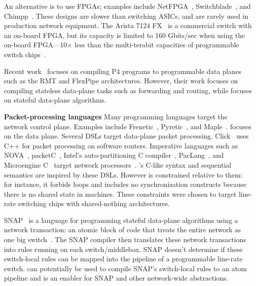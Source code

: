 An alternative is to use FPGAs; examples include NetFPGA~\cite{netfpga},
Switchblade~\cite{switchblade}, and Chimpp~\cite{chimpp}.  These designs are
slower than switching ASICs, and are rarely used in production network
equipment. The Arista 7124 FX~\cite{7124fx} is a commercial switch with an
on-board FPGA, but its capacity is limited to 160 Gbits/sec when using the
on-board FPGA---10$\times$ less than the multi-terabit capacities of programmable
switch chips~\cite{xpliant}.

Recent work~\cite{lavanya_compiler} focuses on compiling P4 programs to
programmable data planes such as the RMT and FlexPipe architectures. However,
their work focuses on compiling stateless data-plane tasks such as forwarding
and routing, while \pktlanguage focuses on stateful data-plane algorithms.

\textbf{Packet-processing languages}
Many programming languages target the network control plane. Examples include
Frenetic~\cite{frenetic}, Pyretic~\cite{pyretic}, and Maple~\cite{maple}.
\pktlanguage focuses on the data plane. Several DSLs target data-plane packet
processing. Click~\cite{click} uses C++ for packet processing on software
routers. Imperative languages such as NOVA~\cite{nova}, packetC~\cite{packetc},
Intel's auto-partitioning C compiler~\cite{intel_uiuc_pldi},
PacLang~\cite{paclang_lang, paclang_partitioner}, and Microengine
C~\cite{microenginec, intel_ixa} target network processors~\cite{ixp2800,
ixp4xx}. \pktlanguage's C-like syntax and sequential semantics are inspired by
these DSLs. However \pktlanguage is constrained relative to them: for instance,
it forbids loops and includes no synchronization constructs because there is no
shared state in \absmachine machines. These constraints were chosen to target
line-rate switching chips with shared-nothing architectures.

SNAP~\cite{snap} is a language for programming stateful data-plane algorithms
using a network transaction: an atomic block of code that treats the entire
network as one big switch~\cite{onebigswitch}. The SNAP compiler then
translates these network transactions into rules running on each
switch/middlebox. SNAP doesn't determine if these switch-local rules can be
mapped into the pipeline of a programmable line-rate switch. \pktlanguage can
potentially be used to compile SNAP's switch-local rules to an atom pipeline
and is an enabler for SNAP and other network-wide abstractions.

